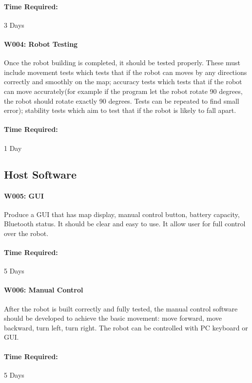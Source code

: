 \documentclass[11pt, a4paper]{report}
\begin{document}
\paragraph{Time Required:}3 Days\\



\paragraph{W004: Robot Testing}
Once the robot building is completed, it should be tested properly. These must include movement tests which tests that if the robot can moves by any directions correctly and smoothly on the map; accuracy tests which tests that if the robot can move accurately(for example if the program let the robot rotate 90 degrees, the robot should rotate exactly 90 degrees. Tests can be repeated to find small error); stability tests which aim to test that if the robot is likely to fall apart.
\paragraph{Time Required:}1 Day\\


\subsection{Host Software}
\paragraph{W005: GUI}
Produce a GUI that has map display, manual control button, battery capacity, Bluetooth status. It should be clear and easy to use. It allow user for full control over the robot.
\paragraph{Time Required:}5 Days\\



\paragraph{W006: Manual Control}
After the robot is built correctly and fully tested, the manual control software should be developed to achieve the basic movement: move forward, move backward, turn left, turn right. The robot can be controlled with PC keyboard or GUI.
\paragraph{Time Required:}5 Days\\
\end{document}

